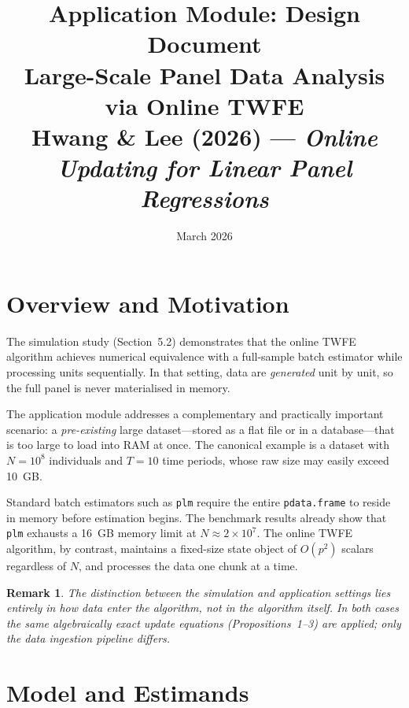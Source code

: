\documentclass[11pt, a4paper]{article}
\title{\textbf{Application Module: Design Document}\\[0.4em]
  \large Large-Scale Panel Data Analysis via Online TWFE\\[0.2em]
  \normalsize Hwang \& Lee (2026) ---
  \textit{Online Updating for Linear Panel Regressions}}
\author{}
\date{March 2026}
\newtheorem{remark}{Remark}
\begin{document}
\maketitle
\tableofcontents
\bigskip\bigskip

\section{Overview and Motivation}

The simulation study (Section~5.2) demonstrates that the online TWFE algorithm
achieves numerical equivalence with a full-sample batch estimator while
processing units sequentially.  In that setting, data are \emph{generated}
unit by unit, so the full panel is never materialised in memory.

The application module addresses a complementary and practically important
scenario: a \emph{pre-existing} large dataset---stored as a flat file or in a
database---that is too large to load into RAM at once.  The canonical example
is a dataset with $N = 10^8$ individuals and $T = 10$ time periods, whose raw
size may easily exceed 10~GB.

Standard batch estimators such as \texttt{plm} require the entire
\texttt{pdata.frame} to reside in memory before estimation begins.  The
benchmark results already show that \texttt{plm} exhausts a 16~GB memory limit
at $N \approx 2 \times 10^7$.  The online TWFE algorithm, by contrast,
maintains a fixed-size state object of $O(p^2)$ scalars regardless of $N$,
and processes the data one chunk at a time.

\begin{remark}
The distinction between the simulation and application settings lies entirely
in \emph{how data enter the algorithm}, not in the algorithm itself.  In both
cases the same algebraically exact update equations (Propositions~1--3) are
applied; only the data ingestion pipeline differs.
\end{remark}

\section{Model and Estimands}
\end{document}
